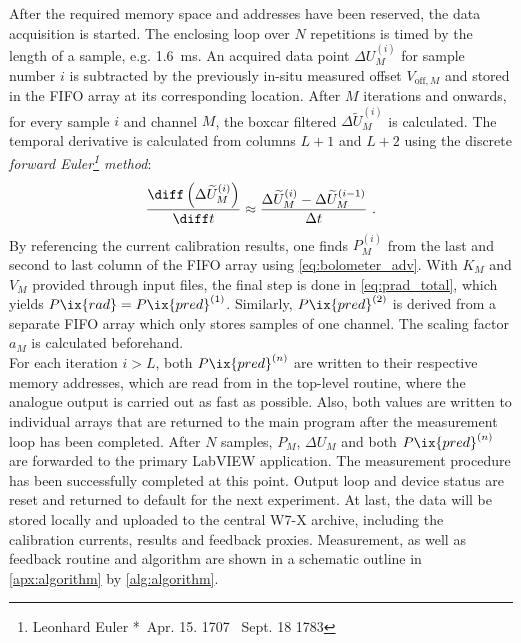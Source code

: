             After the required memory space and addresses have been reserved, the data acquisition is started. The enclosing loop over $N$ repetitions is timed by the length of a sample, e.g. \SI{1.6}{\milli\second}. An acquired data point $\Delta U_{M}^{\left(i\right)}$ for sample number $i$ is subtracted by the previously in-situ measured offset $V_{\text{off}, M}$ and stored in the FIFO array at its corresponding location. After $M$ iterations and onwards, for every sample $i$ and channel $M$, the boxcar filtered $\Delta\widetilde{U}_{M}^{\left(i\right)}$ is calculated. The temporal derivative is calculated from columns $L+1$ and $L+2$ using the discrete \textit{forward Euler\footnote[1]{Leonhard Euler *~Apr. 15. 1707 \textdagger~Sept. 18 1783} method}:%
%
            \begin{align}%
                \frac{\diff\left(\Delta\widetilde{U}_{M}^{\left(i\right)}\right)}{\diff t}\approx\frac{\Delta\widetilde{U}_{M}^{\left(i\right)}-\Delta\widetilde{U}_{M}^{\left(i-1\right)}}{\Delta t}\,\,.\nonumber%
            \end{align}%
%
            By referencing the current calibration results, one finds $P_{M}^{\left(i\right)}$ from the last and second to last column of the FIFO array using \cref{eq:bolometer_adv}. With $K_{M}$ and $V_{M}$ provided through input files, the final step is done in \cref{eq:prad_total}, which yields $P\ix{rad}=P\ix{pred}^{\left(1\right)}$. Similarly, $P\ix{pred}^{\left(2\right)}$ is derived from a separate FIFO array which only stores samples of one channel. The scaling factor $a_{M}$ is calculated beforehand.\\%
            For each iteration $i>L$, both $P\ix{pred}^{\left(n\right)}$ are written to their respective memory addresses, which are read from in the top-level routine, where the analogue output is carried out as fast as possible. Also, both values are written to individual arrays that are returned to the main program after the measurement loop has been completed. After $N$ samples, $P_{M}$, $\Delta U_{M}$ and both $P\ix{pred}^{\left(n\right)}$ are forwarded to the primary LabVIEW application. The measurement procedure has been successfully completed at this point. Output loop and device status are reset and returned to default for the next experiment. At last, the data will be stored locally and uploaded to the central W7-X archive, including the calibration currents, results and feedback proxies. Measurement, as well as feedback routine and algorithm are shown in a schematic outline in \cref{apx:algorithm} by \autoref{alg:algorithm}.\\%
